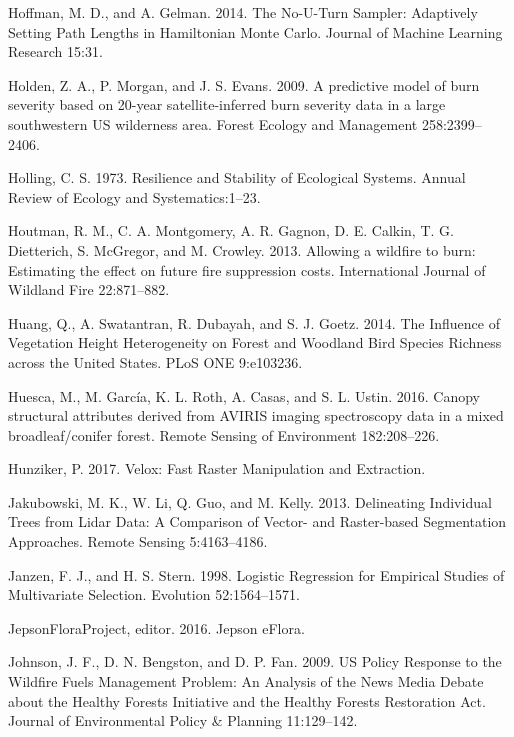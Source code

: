 \documentclass[twoside,12pt,final]{ucthesis-CA2012}
\begin{document}
\begin{ucmainmatter}
\hypertarget{ref-hoffman2014}{}
Hoffman, M. D., and A. Gelman. 2014. The No-U-Turn Sampler: Adaptively
Setting Path Lengths in Hamiltonian Monte Carlo. Journal of Machine
Learning Research 15:31.

\hypertarget{ref-holden2009}{}
Holden, Z. A., P. Morgan, and J. S. Evans. 2009. A predictive model of
burn severity based on 20-year satellite-inferred burn severity data in
a large southwestern US wilderness area. Forest Ecology and Management
258:2399--2406.

\hypertarget{ref-holling1973}{}
Holling, C. S. 1973. Resilience and Stability of Ecological Systems.
Annual Review of Ecology and Systematics:1--23.

\hypertarget{ref-houtman2013}{}
Houtman, R. M., C. A. Montgomery, A. R. Gagnon, D. E. Calkin, T. G.
Dietterich, S. McGregor, and M. Crowley. 2013. Allowing a wildfire to
burn: Estimating the effect on future fire suppression costs.
International Journal of Wildland Fire 22:871--882.

\hypertarget{ref-huang2014}{}
Huang, Q., A. Swatantran, R. Dubayah, and S. J. Goetz. 2014. The
Influence of Vegetation Height Heterogeneity on Forest and Woodland Bird
Species Richness across the United States. PLoS ONE 9:e103236.

\hypertarget{ref-huesca2016}{}
Huesca, M., M. García, K. L. Roth, A. Casas, and S. L. Ustin. 2016.
Canopy structural attributes derived from AVIRIS imaging spectroscopy
data in a mixed broadleaf/conifer forest. Remote Sensing of Environment
182:208--226.

\hypertarget{ref-hunziker2017}{}
Hunziker, P. 2017. Velox: Fast Raster Manipulation and Extraction.

\hypertarget{ref-jakubowski2013}{}
Jakubowski, M. K., W. Li, Q. Guo, and M. Kelly. 2013. Delineating
Individual Trees from Lidar Data: A Comparison of Vector- and
Raster-based Segmentation Approaches. Remote Sensing 5:4163--4186.

\hypertarget{ref-janzen1998}{}
Janzen, F. J., and H. S. Stern. 1998. Logistic Regression for Empirical
Studies of Multivariate Selection. Evolution 52:1564--1571.

\hypertarget{ref-jepsonfloraproject2016}{}
JepsonFloraProject, editor. 2016. Jepson eFlora.

\hypertarget{ref-johnson2009}{}
Johnson, J. F., D. N. Bengston, and D. P. Fan. 2009. US Policy Response
to the Wildfire Fuels Management Problem: An Analysis of the News Media
Debate about the Healthy Forests Initiative and the Healthy Forests
Restoration Act. Journal of Environmental Policy \& Planning
11:129--142.


\end{ucmainmatter}
\end{document}
